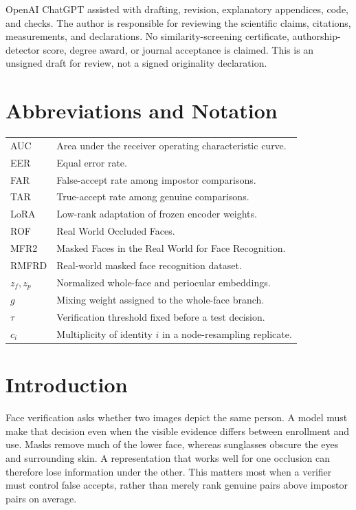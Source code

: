 \documentclass[12pt,a4paper,oneside]{report}
\begin{document}
OpenAI ChatGPT assisted with drafting, revision, explanatory appendices, code, and checks. The author is responsible for reviewing the scientific claims, citations, measurements, and declarations. No similarity-screening certificate, authorship-detector score, degree award, or journal acceptance is claimed. This is an unsigned draft for review, not a signed originality declaration.

\tableofcontents
\listoffigures
\listoftables
\chapter*{Abbreviations and Notation}
\begin{tabular}{lp{110mm}}
\toprule
AUC & Area under the receiver operating characteristic curve.\\
EER & Equal error rate.\\
FAR & False-accept rate among impostor comparisons.\\
TAR & True-accept rate among genuine comparisons.\\
LoRA & Low-rank adaptation of frozen encoder weights.\\
ROF & Real World Occluded Faces.\\
MFR2 & Masked Faces in the Real World for Face Recognition.\\
RMFRD & Real-world masked face recognition dataset.\\
$z_f,z_p$ & Normalized whole-face and periocular embeddings.\\
$g$ & Mixing weight assigned to the whole-face branch.\\
$\tau$ & Verification threshold fixed before a test decision.\\
$c_i$ & Multiplicity of identity $i$ in a node-resampling replicate.\\
\bottomrule
\end{tabular}
\clearpage
{}
\chapter{Introduction}
Face verification asks whether two images depict the same person. A model must make that decision even when the visible evidence differs between enrollment and use. Masks remove much of the lower face, whereas sunglasses obscure the eyes and surrounding skin. A representation that works well for one occlusion can therefore lose information under the other. This matters most when a verifier must control false accepts, rather than merely rank genuine pairs above impostor pairs on average.
\end{document}
